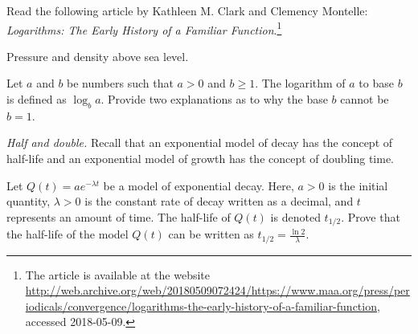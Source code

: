\documentclass[a4paper,oneside,12pt]{article}
\begin{document}
\begin{problem}
\item Read the following article by Kathleen M. Clark and Clemency
  Montelle:
  \emph{Logarithms: The Early History of a Familiar Function}.\footnote{
    The article is available at the website
    \url{http://web.archive.org/web/20180509072424/https://www.maa.org/press/periodicals/convergence/logarithms-the-early-history-of-a-familiar-function},
    accessed 2018-05-09.
  }

\item Pressure and density above sea level.

\item Let $a$ and $b$ be numbers such that $a > 0$ and $b \geq 1$.
  The logarithm of $a$ to base $b$ is defined as $\log_b a$.  Provide
  two explanations as to why the base $b$ cannot be $b = 1$.

\item\emph{Half and double.}
  Recall that an exponential model of decay has the concept of
  half-life and an exponential model of growth has the concept of
  doubling time.
  \begin{packedenum}
  \item\label{subprob:logarithm:half_life}
    Let $Q(t) = a e^{-\lambda t}$ be a model of exponential decay.
    Here, $a > 0$ is the initial quantity, $\lambda > 0$ is the
    constant rate of decay written as a decimal, and $t$ represents an
    amount of time.  The half-life of $Q(t)$ is denoted $t_{1/2}$.
    Prove that the half-life of the model $Q(t)$ can be written as
    $t_{1/2} = \frac{\ln 2}{\lambda}$.


\end{packedenum}
\end{problem}
\end{document}

